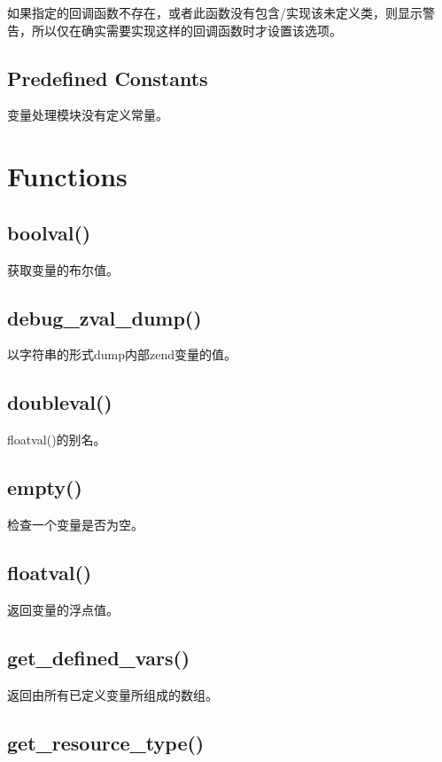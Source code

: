 如果指定的回调函数不存在，或者此函数没有包含/实现该未定义类，则显示警告，所以仅在确实需要实现这样的回调函数时才设置该选项。



\section{Predefined Constants}

变量处理模块没有定义常量。

\chapter{Functions}


\section{boolval()}

获取变量的布尔值。


\section{debug\_zval\_dump()}

以字符串的形式dump内部zend变量的值。

\section{doubleval()}

floatval()的别名。

\section{empty()}

检查一个变量是否为空。

\section{floatval()}

返回变量的浮点值。

\section{get\_defined\_vars()}

返回由所有已定义变量所组成的数组。

\section{get\_resource\_type()}

